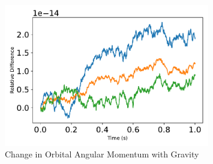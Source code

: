 \begin{figure}[htbp]\centerline{\includegraphics[width=0.8\textwidth]{AutoTeX/ChangeInOrbitalAngularMomentum2}}\caption{Change in Orbital Angular Momentum with Gravity}\label{fig:ChangeInOrbitalAngularMomentum2}\end{figure}